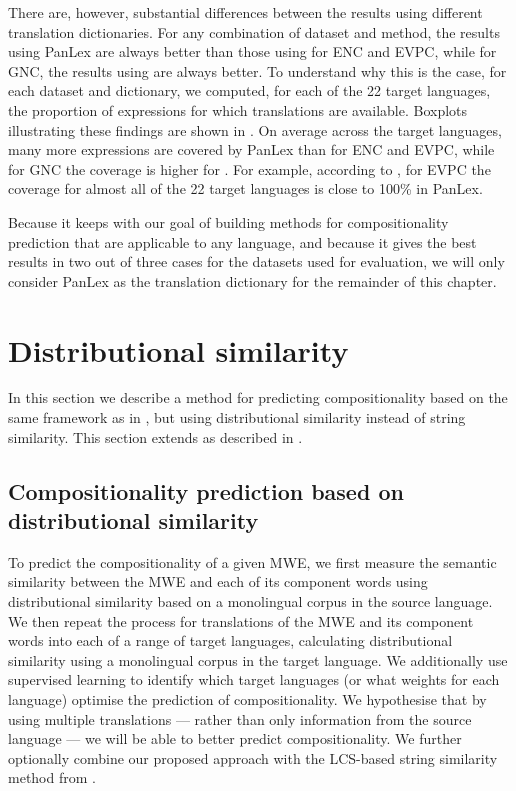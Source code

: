 \documentclass[output=paper
,modfonts
,nonflat]{langsci/langscibook}
\begin{document}
There are, however, substantial differences between the results using
different translation dictionaries. For any combination of dataset and
method, the results using PanLex are always better than those using
\dictcc for ENC and EVPC, while for GNC, the results using \dictcc are
always better. To understand why this is the case, for each dataset
and dictionary, we computed, for each of the 22 target languages, the
proportion of expressions for which translations are
available. Boxplots illustrating these findings are shown in
. On average across the target languages,
many more expressions are covered by PanLex than \dictcc for ENC and
EVPC, while for GNC the coverage is higher for \dictcc. For example,
according to , for EVPC the coverage for
almost all of the 22 target languages is close to 100\% in PanLex.

Because it keeps with our goal of building methods for
compositionality prediction that are applicable to any language, and
because it gives the best results in two out of three cases for the
datasets used for evaluation, we will only consider PanLex as the
translation dictionary for the remainder of this chapter.


\section{Distributional similarity\label{sec:distsim}}

In this section we describe a method for predicting compositionality
based on the same framework as in , but using
distributional similarity instead of string similarity. This section
extends \cite{DBLP:conf/eacl/SalehiCB14} as described in
.

\subsection{Compositionality prediction based on distributional similarity\label{sec:distsimmodel}}

To predict the compositionality of a given MWE, we first measure the
semantic similarity between the MWE and each of its component words
using distributional similarity based on a monolingual corpus in the
source language.  We then repeat the process for translations of the
MWE and its component words into each of a range of target languages,
calculating distributional similarity using a monolingual corpus in
the target language. We additionally use supervised learning to
identify which target languages (or what weights for each language)
optimise the prediction of compositionality. We hypothesise that by
using multiple translations --- rather than only information from the
source language --- we will be able to better predict
compositionality. We further optionally combine our proposed approach
with the LCS-based string similarity method from
.
\end{document}
